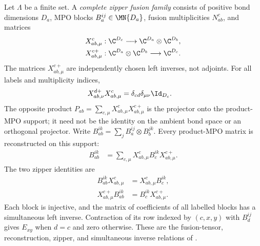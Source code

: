 \begin{definition}%
    \label{def:mpdo_complete_zipper_fusion_family}
    \leanok
    Let $\Lambda$ be a finite set. A \emph{complete zipper fusion family}
    consists of positive bond dimensions $D_a$, MPO blocks
    $B_a^{ij}\in\MN{D_a}$, fusion multiplicities $N_{ab}^{c}$,
    and matrices
    \begin{align}
        X^c_{ab,\mu}    & :\C^{D_c}\longrightarrow
        \C^{D_a}\otimes\C^{D_b}, \notag            \\
        X^{c+}_{ab,\mu} & :\C^{D_a}\otimes\C^{D_b}
        \longrightarrow\C^{D_c}. \notag
    \end{align}
    The matrices $X^{c+}_{ab,\mu}$ are independently chosen left inverses,
    not adjoints. For all labels and multiplicity indices,
    \begin{align}
        X^{d+}_{ab,\nu}X^c_{ab,\mu}
         & =\delta_{cd}\delta_{\mu\nu}\Id_{D_c}.
        \label{eq:rfp_fusion_biorthogonality}
    \end{align}
    The opposite product
    $P_{ab}=\sum_{c,\mu}X^c_{ab,\mu}X^{c+}_{ab,\mu}$ is the projector onto
    the product-MPO support; it need not be the identity on the ambient bond
    space or an orthogonal projector. Write
    $B_{ab}^{ik}=\sum_j B_a^{ij}\otimes B_b^{jk}$.
    Every product-MPO matrix is reconstructed on this support:
    \begin{align}
        B_{ab}^{ik}
         & =\sum_{c,\mu}X^c_{ab,\mu}B_c^{ik}X^{c+}_{ab,\mu}.
        \label{eq:rfp_fusion_reconstruction}
    \end{align}
    The two zipper identities are
    \begin{align}
        B_{ab}^{ik}X^c_{ab,\mu}
         & =X^c_{ab,\mu}B_c^{ik},
        \label{eq:rfp_zipper_synthesis} \\
        X^{c+}_{ab,\mu}B_{ab}^{ik}
         & =B_c^{ik}X^{c+}_{ab,\mu}.
        \label{eq:rfp_zipper_analysis}
    \end{align}
    Each block is injective, and the matrix of coefficients of all labelled
    blocks has a simultaneous left inverse. Contraction of its row indexed
    by $(c,x,y)$ with $B_d^{ij}$ gives $E_{xy}$ when $d=c$ and zero otherwise.
    These are the fusion-tensor, reconstruction, zipper, and simultaneous
    inverse relations of
    \cite[lines~161, 181--200, and 269--277]{Bultinck2017Anyons}.
\end{definition}

